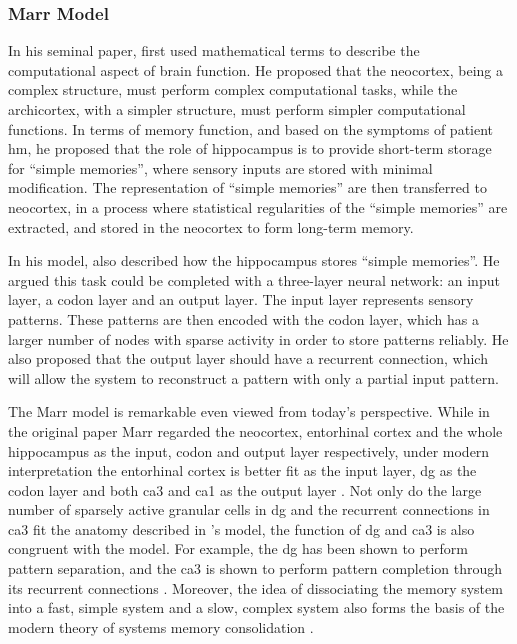 \subsubsection{Marr Model \label{hpc-marr}}
In his seminal paper, \citet{marr71} first used mathematical terms to describe the computational aspect of brain function. He proposed that the neocortex, being a complex structure, must perform complex computational tasks, while the archicortex, with a simpler structure, must perform simpler computational functions. In terms of memory function, and based on the symptoms of patient \gls{hm}, he proposed that the role of hippocampus is to provide short-term storage for ``simple memories'', where sensory inputs are stored with minimal modification. The representation of ``simple memories'' are then transferred to neocortex, in a process where statistical regularities of the ``simple memories'' are extracted, and stored in the neocortex to form long-term memory. 

In his model, \citet{marr71} also described how the hippocampus stores ``simple memories''. He argued this task could be completed with a three-layer neural network: an input layer, a codon layer and an output layer. The input layer represents sensory patterns. These patterns are then encoded with the codon layer, which has a larger number of nodes with sparse activity in order to store patterns reliably. He also proposed that the output layer should have a recurrent connection, which will allow the system to reconstruct a pattern with only a partial input pattern. 

The Marr model is remarkable even viewed from today's perspective. While in the original paper Marr \citep{marr71} regarded the neocortex, entorhinal cortex and the whole hippocampus as the input, codon and output layer respectively, under modern interpretation the entorhinal cortex is better fit as the input layer, \gls{dg} as the codon layer and both \gls{ca3} and \gls{ca1} as the output layer \citep{willshaw15}. Not only do the large number of sparsely active granular cells in \gls{dg} and the recurrent connections in \gls{ca3} fit the anatomy described in \citet{marr71}'s model, the function of \gls{dg} and \gls{ca3} is also congruent with the model. For example, the \gls{dg} has been shown to perform pattern separation, and the \gls{ca3} is shown to perform pattern completion through its recurrent connections \citep{knierim16}. Moreover, the idea of dissociating the memory system into a fast, simple system and a slow, complex system also forms the basis of the modern theory of systems memory consolidation \citep{squire92, mcclelland13}. 

